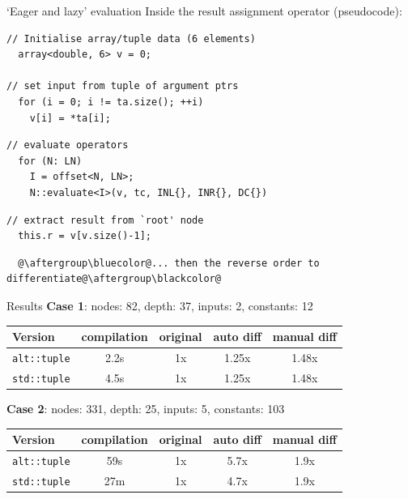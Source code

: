 \documentclass[xcolor=dvipsnames]{beamer}
\begin{document}
\begin{frame}[fragile]{`Eager and lazy' evaluation}
Inside the result assignment operator (pseudocode):
\begin{lstlisting}
// Initialise array/tuple data (6 elements)
  array<double, 6> v = 0;

// set input from tuple of argument ptrs
  for (i = 0; i != ta.size(); ++i)
    v[i] = *ta[i];
\end{lstlisting}
\begin{lstlisting}
// evaluate operators
  for (N: LN)
    I = offset<N, LN>;
    N::evaluate<I>(v, tc, INL{}, INR{}, DC{})
\end{lstlisting}
\begin{lstlisting}
// extract result from `root' node
  this.r = v[v.size()-1];
\end{lstlisting}
\begin{lstlisting}
  @\aftergroup\bluecolor@... then the reverse order to differentiate@\aftergroup\blackcolor@
\end{lstlisting}
\end{frame}


\begin{frame}[fragile]{Results}
\textbf{Case 1}: nodes: 82, depth: 37, inputs: 2, constants: 12
\begin{table}
\begin{tabular}{l | c | c | c | c }
Version & compilation & original & auto diff & manual diff \\
\hline \hline
\texttt{alt::tuple} & 2.2s & 1x & 1.25x & 1.48x \\
\texttt{std::tuple} & 4.5s & 1x & 1.25x & 1.48x \\
\end{tabular}
\end{table}
\vspace{10mm}
\textbf{Case 2}: nodes: 331, depth: 25, inputs: 5, constants: 103
\begin{table}
\begin{tabular}{l | c | c | c | c }
Version & compilation & original & auto diff & manual diff \\
\hline \hline
\texttt{alt::tuple} & 59s & 1x & 5.7x & 1.9x \\
\texttt{std::tuple} & 27m & 1x & 4.7x & 1.9x \\
\end{tabular}
\end{table}
\end{frame}
\end{document}
